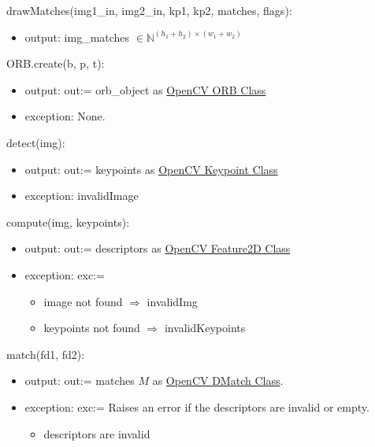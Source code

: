\documentclass[12pt, titlepage]{article}
\begin{document}
\noindent drawMatches(img1\_in, img2\_in, kp1, kp2, matches, flags):
\begin{itemize}
\item output: img\_matches $\in \mathbb{N}^{(h_{1}+h_{2}) \times (w_{1}+w_{2})}$
\end{itemize}

\noindent ORB.create(b, p, t):
\begin{itemize}
    \item output: out:= orb\_object as \href{https://docs.opencv.org/3.4/db/d95/classcv_1_1ORB.html}{OpenCV ORB Class}
    \item exception: None. 
\end{itemize}

\noindent detect(img):
\begin{itemize}
    \item output: out:= keypoints as \href{https://docs.opencv.org/3.4/d2/d29/classcv_1_1KeyPoint.html}{OpenCV Keypoint Class}
    \item exception: invalidImage
\end{itemize}

\noindent compute(img, keypoints):
\begin{itemize}
    \item output: out:= descriptors as \href{https://docs.opencv.org/4.x/d0/d13/classcv_1_1Feature2D.html}{OpenCV Feature2D Class}
    \item exception: exc:=
    \begin{itemize}
      \item image not found $\Rightarrow$ invalidImg
      \item keypoints not found $\Rightarrow$ invalidKeypoints
    \end{itemize}
\end{itemize}

\noindent match(fd1, fd2):
\begin{itemize}
\item output: out:= matches $M$ as \href{https://docs.opencv.org/3.4/d4/de0/classcv_1_1DMatch.html}{OpenCV DMatch Class}.
\item exception: exc:= Raises an error if the descriptors are invalid or empty.
  \begin{itemize}
      \item descriptors are invalid
  \end{itemize}
\end{itemize}
\end{document}
